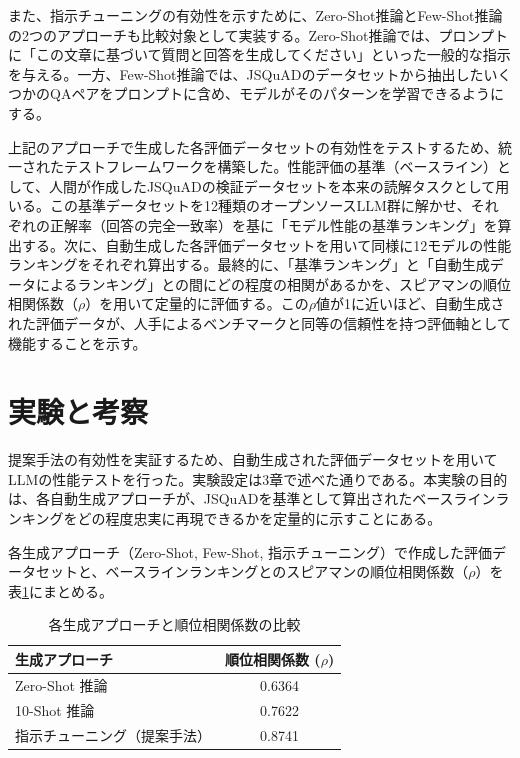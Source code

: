 \documentclass[twocolumn]{jsarticle}
\begin{document}
また、指示チューニングの有効性を示すために、Zero-Shot推論とFew-Shot推論の2つのアプローチも比較対象として実装する。Zero-Shot推論では、プロンプトに「この文章に基づいて質問と回答を生成してください」といった一般的な指示を与える。一方、Few-Shot推論では、JSQuADのデータセットから抽出したいくつかのQAペアをプロンプトに含め、モデルがそのパターンを学習できるようにする。

上記のアプローチで生成した各評価データセットの有効性をテストするため、統一されたテストフレームワークを構築した。性能評価の基準（ベースライン）として、人間が作成したJSQuADの検証データセットを本来の読解タスクとして用いる。この基準データセットを12種類のオープンソースLLM群に解かせ、それぞれの正解率（回答の完全一致率）を基に「モデル性能の基準ランキング」を算出する。次に、自動生成した各評価データセットを用いて同様に12モデルの性能ランキングをそれぞれ算出する。最終的に、「基準ランキング」と「自動生成データによるランキング」との間にどの程度の相関があるかを、スピアマンの順位相関係数（$\rho$）を用いて定量的に評価する。この$\rho$値が1に近いほど、自動生成された評価データが、人手によるベンチマークと同等の信頼性を持つ評価軸として機能することを示す。



\section{実験と考察}

提案手法の有効性を実証するため、自動生成された評価データセットを用いてLLMの性能テストを行った。実験設定は3章で述べた通りである。本実験の目的は、各自動生成アプローチが、JSQuAD\cite{JGLUE}を基準として算出されたベースラインランキングをどの程度忠実に再現できるかを定量的に示すことにある。

各生成アプローチ（Zero-Shot, Few-Shot, 指示チューニング）で作成した評価データセットと、ベースラインランキングとのスピアマンの順位相関係数（$\rho$）を表\ref{tab:rho_summary}にまとめる。

\begin{table}[h]
  \centering
  \caption{各生成アプローチと順位相関係数の比較}
  \label{tab:rho_summary}
  \begin{tabular}{lc}
  \hline
  生成アプローチ       & 順位相関係数 ($\rho$) \\
  \hline
  Zero-Shot 推論       & 0.6364                     \\
  10-Shot 推論         & 0.7622                     \\
  指示チューニング（提案手法） & 0.8741                     \\
  \hline
  \end{tabular}
\end{table}
\end{document}
